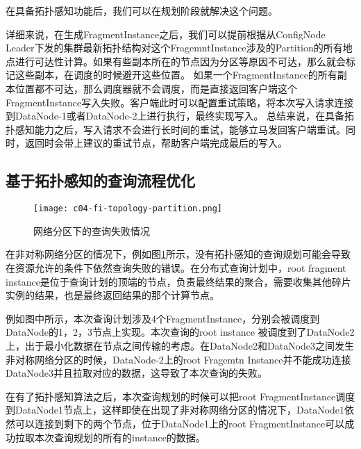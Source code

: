 在具备拓扑感知功能后，我们可以在规划阶段就解决这个问题。

详细来说，在生成FragmentInstance之后，我们可以提前根据从ConfigNode Leader下发的集群最新拓扑结构对这个FragemntInstance涉及的Partition的所有地点进行可达性计算。如果有些副本所在的节点因为分区等原因不可达，那么就会标记这些副本，在调度的时候避开这些位置。
如果一个FragmentInstance的所有副本位置都不可达，那么调度器就不会调度，而是直接返回客户端这个FragmentInstance写入失败。客户端此时可以配置重试策略，将本次写入请求连接到DataNode-1或者DataNode-2上进行执行，最终实现写入。
总结来说，在具备拓扑感知能力之后，写入请求不会进行长时间的重试，能够立马发回客户端重试。同时，返回时会带上建议的重试节点，帮助客户端完成最后的写入。

\subsection{基于拓扑感知的查询流程优化}\label{sec:topology-query-plan}

\begin{figure}
  \centering
  \texttt{[image: c04-fi-topology-partition.png]}
  \caption{网络分区下的查询失败情况}
  \label{fig:fi-topology-partition}
\end{figure}

在非对称网络分区的情况下，例如图\ref{fig:fi-topology-partition}所示，没有拓扑感知的查询规划可能会导致在资源允许的条件下依然查询失败的错误。在分布式查询计划中，root fragment instance是位于查询计划的顶端的节点，负责最终结果的聚合，需要收集其他碎片实例的结果，也是最终返回结果的那个计算节点。

例如图中所示，本次查询计划涉及4个FragmentInstance，分别会被调度到DataNode的1，2，3节点上实现。本次查询的root instance 被调度到了DataNode2上，出于最小化数据在节点之间传输的考虑。在DataNode2和DataNode3之间发生非对称网络分区的时候，DataNode-2上的root Fragemtn Instance并不能成功连接DataNode3并且拉取对应的数据，这导致了本次查询的失败。

在有了拓扑感知算法之后，本次查询规划的时候可以把root FragmentInstance调度到DataNode1节点上，这样即使在出现了非对称网络分区的情况下，DataNode1依然可以连接到剩下的两个节点，位于DataNode1上的root FragmentInstance可以成功拉取本次查询规划的所有的instance的数据。

